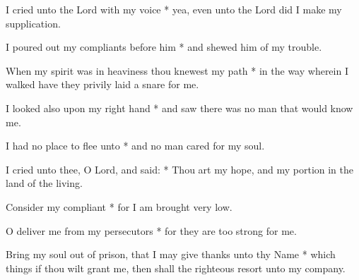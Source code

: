 \begin{multicols}{2}
	
	I cried unto the Lord with my voice * yea, even unto the Lord did I make my supplication.
	
	I poured out my compliants before him * and shewed him of my trouble.
	
	When my spirit was in heaviness thou knewest my path * in the way wherein I walked have they privily laid a snare for me.
	
	I looked also upon my right hand * and saw there was no man that would know me.
	
	I had no place to flee unto * and no man cared for my soul.
	
	I cried unto thee, O Lord, and said: * Thou art my hope, and my portion in the land of the living.
	
	Consider my compliant * for I am brought very low.
	
	O deliver me from my persecutors * for they are too strong for me.
	
	Bring my soul out of prison, that I may give thanks unto thy Name * which things if thou wilt grant me, then shall the righteous resort unto my company.
	
	\gloria{}
\end{multicols}